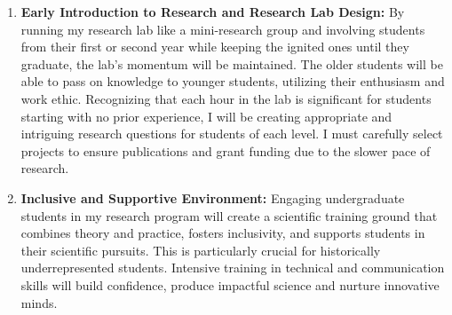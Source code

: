 \begin{enumerate}[label=(\arabic*),topsep=0pt, leftmargin=0pt,nosep]
    \item \textbf{Early Introduction to Research and Research Lab Design:} By running my research lab like a mini-research group and involving students from their first or second year while keeping the ignited ones until they graduate, the lab's momentum will be maintained. The older students will be able to pass on knowledge to younger students, utilizing their enthusiasm and work ethic. Recognizing that each hour in the lab is significant for students starting with no prior experience, I will be creating appropriate and intriguing research questions for students of each level. I must carefully select projects to ensure publications and grant funding due to the slower pace of research. 





    \item \textbf{Inclusive and Supportive Environment:} Engaging undergraduate students in my research program will create a scientific training ground that combines theory and practice, fosters inclusivity, and supports students in their scientific pursuits. This is particularly crucial for historically underrepresented students. Intensive training in technical and communication skills will build confidence, produce impactful science and nurture innovative minds.
\end{enumerate}

